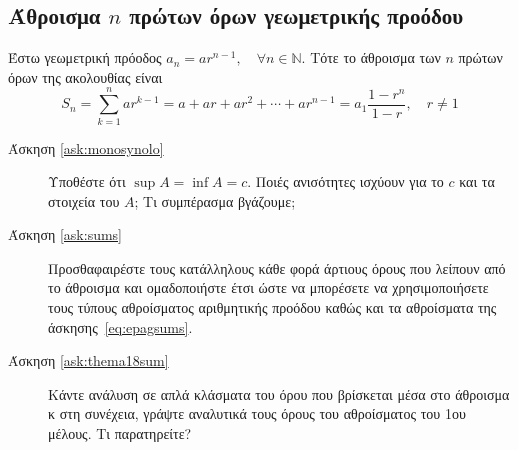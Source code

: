   \subsection*{Άθροισμα $n$ πρώτων όρων γεωμετρικής προόδου}
  Έστω γεωμετρική πρόοδος $ a_{n} = a r^{n-1}, \quad \forall n \in \mathbb{N} $.
  Τότε το άθροισμα των $n$ πρώτων όρων της ακολουθίας είναι
  \[
    S_{n} = \sum_{k=1}^{n} ar^{k-1} = a + ar + ar^{2} + \cdots + ar^{n-1} = 
    a_{1}\frac{1 - r^{n}}{1-r}, \quad r \neq 1 
  \] 

  \begin{description}
    \item [Άσκηση \ref{ask:monosynolo}] Υποθέστε ότι $ \sup A = \inf A = c
      $. Ποιές ανισότητες ισχύουν για το $c$ και τα στοιχεία του $A$; 
      Τι συμπέρασμα βγάζουμε;

    \item [Άσκηση \ref{ask:sums}] Προσθαφαιρέστε τους κατάλληλους κάθε φορά  
      άρτιους όρους που λείπουν από το άθροισμα και ομαδοποιήστε έτσι ώστε να 
      μπορέσετε να χρησιμοποιήσετε τους τύπους αθροίσματος αριθμητικής προόδου 
      καθώς και τα αθροίσματα της άσκησης~\ref{eq:epagsums}.

    \item [Άσκηση \ref{ask:thema18sum}] Κάντε ανάλυση σε απλά κλάσματα 
      του όρου που βρίσκεται μέσα στο άθροισμα κ στη συνέχεια, γράψτε
      αναλυτικά τους όρους του αθροίσματος του 1ου μέλους. Τι παρατηρείτε?
  \end{description}
  
